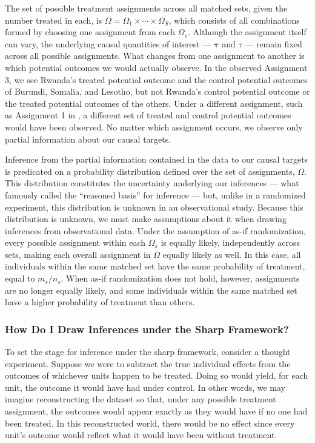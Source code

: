 \documentclass[
  12pt,
  leqno]{article}
\begin{document}
The set of possible treatment assignments across all matched sets, given
the number treated in each, is
\(\Omega = \Omega_1 \times \cdots \times \Omega_S\), which consists of
all combinations formed by choosing one assignment from each
\(\Omega_s\). Although the assignment itself can vary, the underlying
causal quantities of interest --- \(\bm{\tau}\) and \(\tau\) --- remain
fixed across all possible assignments. What changes from one assignment
to another is which potential outcomes we would actually observe. In the
observed Assignment 3, we see Rwanda's treated potential outcome and the
control potential outcomes of Burundi, Somalia, and Lesotho, but not
Rwanda's control potential outcome or the treated potential outcomes of
the others. Under a different assignment, such as Assignment 1 in
, a different set of treated and
control potential outcomes would have been observed. No matter which
assignment occurs, we observe only partial information about our causal
targets.

Inference from the partial information contained in the data to our
causal targets is predicated on a probability distribution defined over
the set of assignments, \(\Omega\). This distribution constitutes the
uncertainty underlying our inferences --- what \citet[p.~14]{fisher1935}
famously called the ``reasoned basis'' for inference --- but, unlike in
a randomized experiment, this distribution is unknown in an
observational study. Because this distribution is unknown, we must make
assumptions about it when drawing inferences from observational data.
Under the assumption of as-if randomization, every possible assignment
within each \(\Omega_s\) is equally likely, independently across sets,
making each overall assignment in \(\Omega\) equally likely as well. In
this case, all individuals within the same matched set have the same
probability of treatment, equal to \(m_s / n_s\). When as-if
randomization does not hold, however, assignments are no longer equally
likely, and some individuals within the same matched set have a higher
probability of treatment than others.

\subsubsection{How Do I Draw Inferences under the Sharp
Framework?}\label{how-do-i-draw-inferences-under-the-sharp-framework}

To set the stage for inference under the sharp framework, consider a
thought experiment. Suppose we were to subtract the true individual
effects from the outcomes of whichever units happen to be treated. Doing
so would yield, for each unit, the outcome it would have had under
control. In other words, we may imagine reconstructing the dataset so
that, under any possible treatment assignment, the outcomes would appear
exactly as they would have if no one had been treated. In this
reconstructed world, there would be no effect since every unit's outcome
would reflect what it would have been without treatment.
\end{document}

